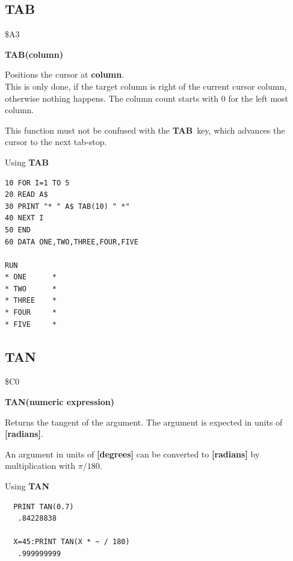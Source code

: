 \subsection{TAB}
\begin{description}[leftmargin=2cm,style=nextline]
\item [Token:] \$A3
\item [Format:] {\bf TAB(column)}
\item [Usage:] Positions the cursor at {\bf column}. \\
               This is only done, if the target column is right
               of the current cursor column, otherwise nothing
               happens. The column count starts with 0 for the
               left most column.

\item [Remarks:] This function must not be confused with the
               {\bf TAB} key, which advances the cursor to the next
               tab-stop.

\item [Example:] Using {\bf TAB}
\begin{tcolorbox}[colback=black,coltext=white]
\verbatimfont{\codefont}
\begin{verbatim}
10 FOR I=1 TO 5
20 READ A$
30 PRINT "* " A$ TAB(10) " *"
40 NEXT I
50 END
60 DATA ONE,TWO,THREE,FOUR,FIVE

RUN
* ONE      *
* TWO      *
* THREE    *
* FOUR     *
* FIVE     *
\end{verbatim}
\end{tcolorbox}
\end{description}


\newpage
\subsection{TAN}
\begin{description}[leftmargin=2cm,style=nextline]
\item [Token:] \$C0
\item [Format:] {\bf TAN(numeric expression)}
\item [Usage:] Returns the tangent of the
               argument.
               The argument is expected in units of {\bf [radians]}.

\item [Remarks:] An argument in units of {\bf [degrees]}
                 can be converted to {\bf [radians]}
               by multiplication with $\pi/180$.
\item [Example:] Using {\bf TAN}
\begin{tcolorbox}[colback=black,coltext=white]
\verbatimfont{\codefont}
\begin{verbatim}
  PRINT TAN(0.7)
   .84228838

  X=45:PRINT TAN(X * ~ / 180)
   .999999999
\end{verbatim}
\end{tcolorbox}
\end{description}

